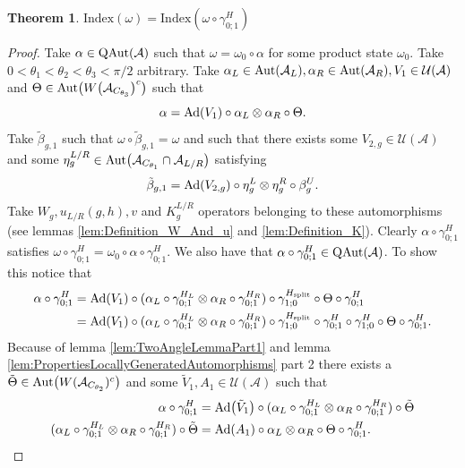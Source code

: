 \documentclass[12pt,a4paper,twoside]{article}
\let\originalleft\left
\let\originalright\right
\renewcommand{\left}{\mathopen{}\mathclose\bgroup\originalleft}
\renewcommand{\right}{\aftergroup\egroup\originalright}
\newcommand{\UU}{\mathcal U}
\renewcommand{\AA}{\mathcal A}
\newcommand{\Ad}[1]{\textrm{Ad}\left(#1\right)}
\newcommand{\Aut}[1]{\textrm{Aut}\left(#1\right)}
\newcommand{\QAut}[1]{\textrm{QAut}\left(#1\right)}
\theoremstyle{definition}
\newtheorem{theorem}{Theorem}[section]
\numberwithin{equation}{section}
\begin{document}
\begin{theorem}\label{thrm:IndexInvariantUnderLGA}
	$\textrm{Index}(\omega)=\textrm{Index}(\omega\circ\gamma^H_{0;1})$
\end{theorem}
\begin{proof}
	Take $\alpha\in\QAut{\AA}$ such that $\omega=\omega_0\circ\alpha$ for some product state $\omega_0$. Take $0<\theta_1<\theta_2<\theta_3<\pi/2$ arbitrary. Take $\alpha_L\in\Aut{\AA_L},\alpha_R\in\Aut{\AA_R},V_1\in\UU(\AA)$ and $\Theta\in\Aut{W\left(\AA_{C_{\theta_3}}\right)^c}$ such that
	\begin{equation}
		\alpha=\Ad{V_1}\circ\alpha_L\otimes\alpha_R\circ\Theta.
	\end{equation}
	Take $\tilde{\beta}_{g,1}$ such that $\omega\circ\tilde{\beta}_{g,1}=\omega$ and such that there exists some $V_{2,g}\in\UU(\AA)$ and some $\eta_g^{L/R}\in\Aut{\AA_{C_{\theta_1}}\cap\AA_{L/R}}$ satisfying
	\begin{equation}
		\tilde{\beta}_{g,1}=\Ad{V_{2,g}}\circ\eta_{g}^L\otimes\eta_{g}^R\circ\beta_g^U.
	\end{equation}
	Take $W_g,u_{L/R}(g,h),v$ and $K_g^{L/R}$ operators belonging to these automorphisms (see lemmas \ref{lem:Definition_W_And_u} and \ref{lem:Definition_K}). Clearly $\alpha\circ\gamma^H_{0;1}$ satisfies $\omega\circ\gamma^{H}_{0;1}=\omega_0\circ\alpha\circ\gamma^{H}_{0;1}$. We also have that $\alpha\circ\gamma^{H}_{0;1}\in\QAut{\AA}$. To show this notice that
	\begin{align}
		\alpha\circ\gamma^{H}_{0;1}&=\Ad{V_1}\circ(\alpha_L\circ\gamma^{H_L}_{0;1}\otimes\alpha_R\circ\gamma^{H_R}_{0;1})\circ\gamma^{H_\text{split}}_{1;0}\circ\Theta\circ\gamma^H_{0;1}\\
		&=\Ad{V_1}\circ(\alpha_L\circ\gamma^{H_L}_{0;1}\otimes\alpha_R\circ\gamma^{H_R}_{0;1})\circ\gamma^{H_\text{split}}_{1;0}\circ\gamma^{H}_{0;1}\circ\gamma^{H}_{1;0}\circ\Theta\circ\gamma^H_{0;1}.
	\end{align}
	Because of lemma \ref{lem:TwoAngleLemmaPart1} and lemma \ref{lem:PropertiesLocallyGeneratedAutomorphisms} part 2 there exists a $\tilde{\Theta}\in\Aut{W(\AA_{C_{\theta_2}})^c}$ and some $\tilde V_1,A_1\in\UU(\AA)$ such that
	\begin{align}
		\alpha\circ\gamma^H_{0;1}&=\Ad{\tilde V_1}\circ(\alpha_L\circ\gamma^{H_L}_{0;1}\otimes\alpha_R\circ\gamma^{H_R}_{0;1})\circ\tilde\Theta\\
		\label{eq:ProofThatTheH2IndexIsInvariantUnderLGA's_Definition_A1}
		(\alpha_L\circ\gamma^{H_L}_{0;1}\otimes\alpha_R\circ\gamma^{H_R}_{0;1})\circ\tilde\Theta&=\Ad{A_1}\circ \alpha_L\otimes\alpha_R\circ\Theta\circ\gamma^{H}_{0;1}.

\end{align}
\end{proof}
\end{document}
